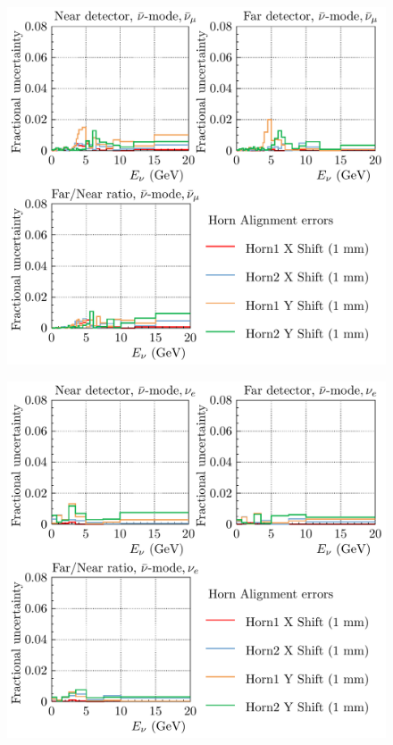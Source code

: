 \documentclass{article}
\begin{document}
\begin{figure}
  \includegraphics[width=\textwidth]{plots/fracerrs/nubarmode_numubar_HornAlignment}
  \caption{}
  \label{fig:hornalign_nubar_numubar}
\end{figure}

\begin{figure}
  \includegraphics[width=\textwidth]{plots/fracerrs/nubarmode_nue_HornAlignment}
  \caption{}
  \label{fig:hornalign_nubar_nue}
\end{figure}
\end{document}
